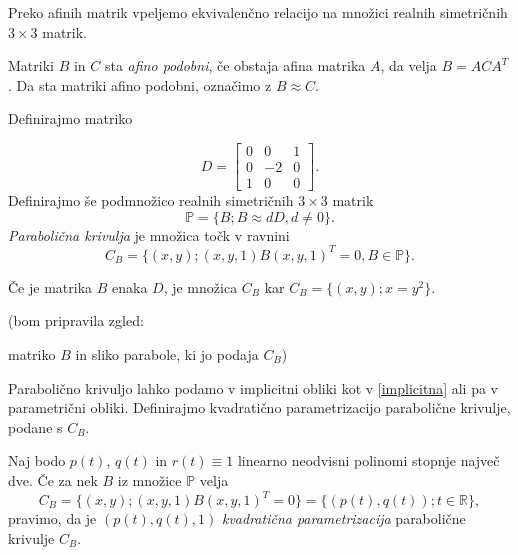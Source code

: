 \documentclass[mat1]{fmfdelo}
\newcommand{\R}{\mathbb R}
\newcommand{\PP}{\mathbb P}
\begin{document}

Preko afinih matrik vpeljemo ekvivalenčno relacijo na množici realnih simetričnih $3 \times 3$ matrik.

\begin{definicija}
Matriki $B$ in $C$ sta \emph{afino podobni}, če obstaja afina matrika $A$, da velja $B = A C A^{T}$.
Da sta matriki afino podobni, označimo z $B \approx C$.
\end{definicija}


\begin{definicija}
Definirajmo matriko 

$$D = 
\begin{bmatrix}
0 & 0 & 1 \\
0 & -2 & 0 \\
1 & 0 & 0
\end{bmatrix}.
$$
Definirajmo še podmnožico realnih simetričnih $3 \times 3$ matrik $$\PP = \{ B; B \approx d D, d \neq 0 \} .$$
\emph{Parabolična krivulja} je množica točk v ravnini 
\begin{equation}\label{implicitna}
 C_B = \{ (x,y); (x,y,1) B (x, y, 1)^T = 0, B \in \PP \}.
 \end{equation}
\end{definicija}

Če je matrika $B$ enaka $D$, je množica $C_B$ kar $C_B = \{ (x,y); x = y^2 \}$.

\begin{zgled}

(bom pripravila zgled: 

matriko $B$ in sliko parabole, ki jo podaja $C_B$)

\end{zgled}

Parabolično krivuljo lahko podamo v implicitni obliki kot v \eqref{implicitna} ali pa v parametrični obliki. Definirajmo kvadratično parametrizacijo parabolične krivulje, podane s $C_B$.

\begin{definicija}
Naj bodo $p(t)$, $q(t)$ in $r(t) \equiv 1$ linearno neodvisni polinomi stopnje največ dve. Če za nek $B$ iz množice $\PP$ velja 
$$ C_B = \{ (x,y); (x,y,1) B (x, y, 1)^T = 0 \} = \{ (p(t), q(t)); t \in \R \},$$
pravimo, da je $( p(t), q(t), 1)$ \emph{kvadratična parametrizacija} parabolične krivulje $C_B$.
\end{definicija}
\end{document}
